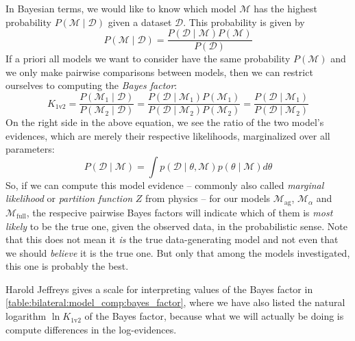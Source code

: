 \documentclass[\relativeRoot/main.tex]{subfiles}
\begin{document}
In Bayesian terms, we would like to know which model $\mathcal{M}$ has the highest probability $P\left( \mathcal{M} \mid \boldsymbol{\mathcal{D}} \right)$ given a dataset $\boldsymbol{\mathcal{D}}$. This probability is given by
%
\begin{equation}
    P\left( \mathcal{M} \mid \boldsymbol{\mathcal{D}} \right) = \frac{P\left( \boldsymbol{\mathcal{D}} \mid \mathcal{M} \right) P\left( \mathcal{M} \right)}{P \left( \boldsymbol{\mathcal{D}} \right)}
\end{equation}
%
If a priori all models we want to consider have the same probability $P \left( \mathcal{M} \right)$ and we only make pairwise comparisons between models, then we can restrict ourselves to computing the \emph{Bayes factor}:
%
\begin{equation}
    K_\text{1v2} = \frac{P\left( \mathcal{M}_1 \mid \boldsymbol{\mathcal{D}} \right)}{P\left( \mathcal{M}_2 \mid \boldsymbol{\mathcal{D}} \right)} = \frac{P\left( \boldsymbol{\mathcal{D}} \mid \mathcal{M}_1 \right) P\left( \mathcal{M}_1 \right)}{P\left( \boldsymbol{\mathcal{D}} \mid \mathcal{M}_2 \right) P\left( \mathcal{M}_2 \right)} = \frac{P\left( \boldsymbol{\mathcal{D}} \mid \mathcal{M}_1 \right)}{P\left( \boldsymbol{\mathcal{D}} \mid \mathcal{M}_2 \right)}
\end{equation}
%
On the right side in the above equation, we see the ratio of the two model's evidences, which are merely their respective likelihoods, marginalized over all parameters:
%
\begin{equation} \label{eq:bilateral:evidence}
    P\left( \boldsymbol{\mathcal{D}} \mid \mathcal{M} \right) = \int{ p\left( \boldsymbol{\mathcal{D}} \mid \theta, \mathcal{M} \right) p(\theta \mid \mathcal{M}) d\theta}
\end{equation}
%
So, if we can compute this model evidence -- commonly also called \emph{marginal likelihood} or \emph{partition function} $Z$ from physics -- for our models $\mathcal{M}_\text{ag}$, $\mathcal{M}_\alpha$ and $\mathcal{M}_\text{full}$, the respecive pairwise Bayes factors will indicate which of them is \emph{most likely} to be the true one, given the observed data, in the probabilistic sense. Note that this does not mean it \emph{is} the true data-generating model and not even that we should \emph{believe} it is the true one. But only that among the models investigated, this one is probably the best.

Harold Jeffreys gives a scale for interpreting values of the Bayes factor \cite{jeffreys_theory_1998} in \cref{table:bilateral:model_comp:bayes_factor}, where we have also listed the natural logarithm $\ln{K_\text{1v2}}$ of the Bayes factor, because what we will actually be doing is compute differences in the log-evidences.
\end{document}
